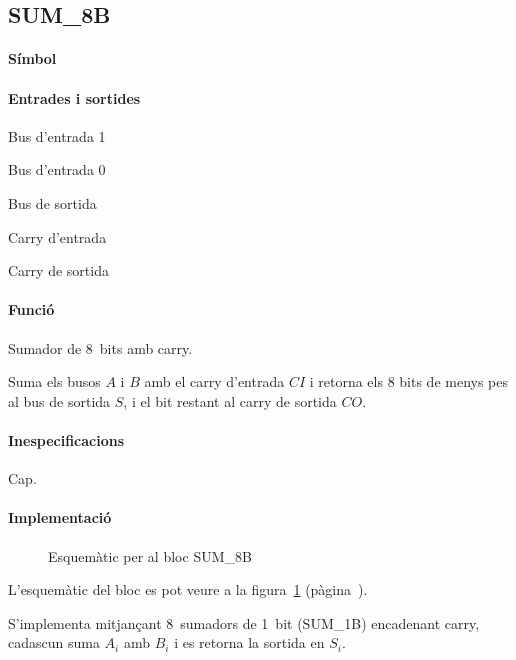 \subsection{\label{sub:\projectname-SUM_8B} \textsf{SUM\_8B}}

\paragraph{Símbol}
\begin{center}  \end{center}

\paragraph{Entrades i sortides}

\begin{where}
\item[\nodenamerange{A}{7}{0}] Bus d'entrada 1
\item[\nodenamerange{B}{7}{0}] Bus d'entrada 0
\item[\nodenamerange{S}{7}{0}] Bus de sortida
\item[\nodenamebit{CI}] Carry d'entrada
\item[\nodenamebit{CO}] Carry de sortida
\end{where}

\paragraph{Funció}

Sumador de 8~bits amb carry.

Suma els busos $A$ i $B$ amb el carry d'entrada $CI$ i retorna els 8 bits de menys
pes al bus de sortida $S$, i el bit restant al carry de sortida $CO$.

\paragraph{Inespecificacions}

Cap.

\paragraph{Implementació}

\begin{figure}[b]
  \begin{center}
  \end{center}
  \caption{\label{fig:\projectname-SUM_8B} Esquemàtic per al bloc \textsf{SUM\_8B}}
\end{figure}

L'esquemàtic del bloc es pot veure a la figura~\ref{fig:\projectname-SUM_8B} (pàgina~\pageref{fig:\projectname-SUM_8B}).

S'implementa mitjançant 8~sumadors de 1~bit (\textsf{SUM\_1B}) encadenant carry,
cadascun suma $A_i$ amb $B_i$ i es retorna la sortida en $S_i$.

\vspace{1cm}
